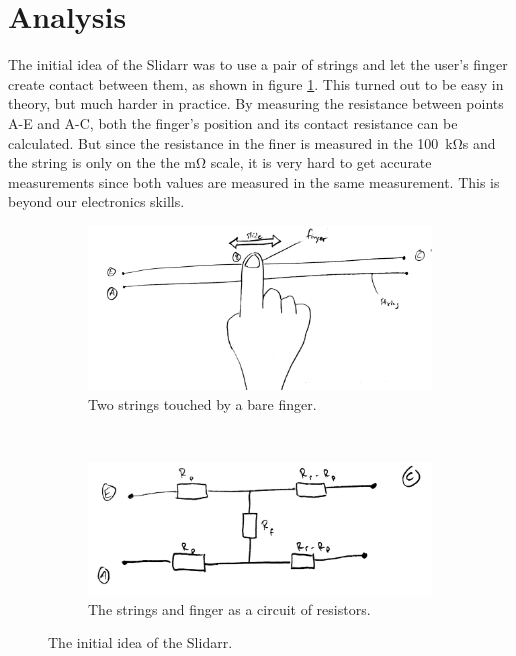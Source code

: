 \documentclass{article}
\begin{document}
\section{Analysis}
The initial idea of the Slidarr was to use a pair of strings and let the user's finger create contact between them, as shown in figure \ref{fig:slidarr_initial_sketch}. This turned out to be easy in theory, but much harder in practice. By measuring the resistance between points A-E and A-C, both the finger's position and its contact resistance can be calculated. But since the resistance in the finer is measured in the \SI{100}{\kilo\ohm}s and the string is only on the the \si{\milli\ohm} scale, it is very hard to get accurate measurements since both values are measured in the same measurement. This is beyond our electronics skills.

\begin{figure}[h]
  \centering
  \begin{subfigure}[b]{0.45\textwidth}
    \includegraphics[width=\textwidth]{slidar_initial}
    \caption{Two strings touched by a bare finger.}
    \label{fig:slidarr_initial_sketch}
  \end{subfigure}
  ~
  \begin{subfigure}[b]{0.45\textwidth}
    \includegraphics[width=\textwidth]{slidar_initial_circuit}
    \caption{The strings and finger as a circuit of resistors.}
    \label{fig:slidarr_initial_circuit}
  \end{subfigure}
  \caption{The initial idea of the Slidarr.}
  \label{fig:slidarr_initial}
\end{figure}
\end{document}
